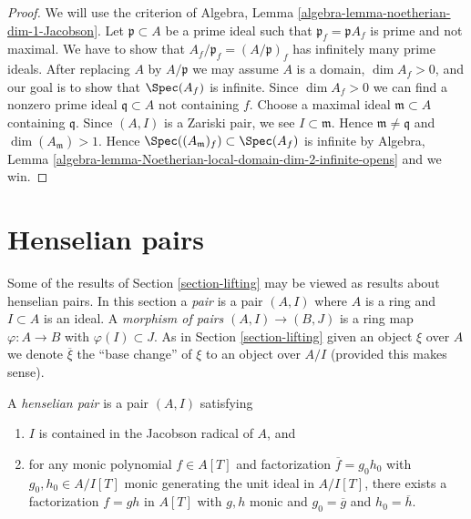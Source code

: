 \begin{proof}
We will use the criterion of
Algebra, Lemma \ref{algebra-lemma-noetherian-dim-1-Jacobson}.
Let $\mathfrak p \subset A$ be a prime ideal such that
$\mathfrak p_f = \mathfrak p A_f$ is prime and not maximal. We have to
show that $A_f/\mathfrak p_f = (A/\mathfrak p)_f$
has infinitely many prime ideals. After replacing $A$ by $A/\mathfrak p$
we may assume $A$ is a domain, $\dim A_f > 0$, and our goal is to
show that $\Spec(A_f)$ is infinite. Since $\dim A_f > 0$ we can
find a nonzero prime ideal $\mathfrak q \subset A$ not containing $f$.
Choose a maximal ideal $\mathfrak m \subset A$ containing $\mathfrak q$.
Since $(A, I)$ is a Zariski pair, we see $I \subset \mathfrak m$.
Hence $\mathfrak m \not = \mathfrak q$ and $\dim(A_\mathfrak m) > 1$.
Hence $\Spec((A_\mathfrak m)_f) \subset \Spec(A_f)$ is infinite by
Algebra, Lemma \ref{algebra-lemma-Noetherian-local-domain-dim-2-infinite-opens}
and we win.
\end{proof}











\section{Henselian pairs}
\label{section-henselian-pairs}

\noindent
Some of the results of Section \ref{section-lifting} may be viewed as results
about henselian pairs. In this section a {\it pair} is a pair $(A, I)$
where $A$ is a ring and $I \subset A$ is an ideal. A {\it morphism of pairs}
$(A, I) \to (B, J)$ is a ring map $\varphi : A \to B$ with
$\varphi(I) \subset J$. As in
Section \ref{section-lifting} given an object $\xi$ over $A$ we denote
$\overline{\xi}$ the ``base change'' of $\xi$ to an object over $A/I$
(provided this makes sense).

\begin{definition}
\label{definition-henselian-pair}
A {\it henselian pair} is a pair $(A, I)$ satisfying
\begin{enumerate}
\item $I$ is contained in the Jacobson radical of $A$, and
\item for any monic polynomial $f \in A[T]$ and factorization
$\overline{f} = g_0h_0$ with $g_0, h_0 \in A/I[T]$ monic
generating the unit ideal in $A/I[T]$, there
exists a factorization $f = gh$ in $A[T]$ with $g, h$ monic
and $g_0 = \overline{g}$ and $h_0 = \overline{h}$.
\end{enumerate}
\end{definition}

